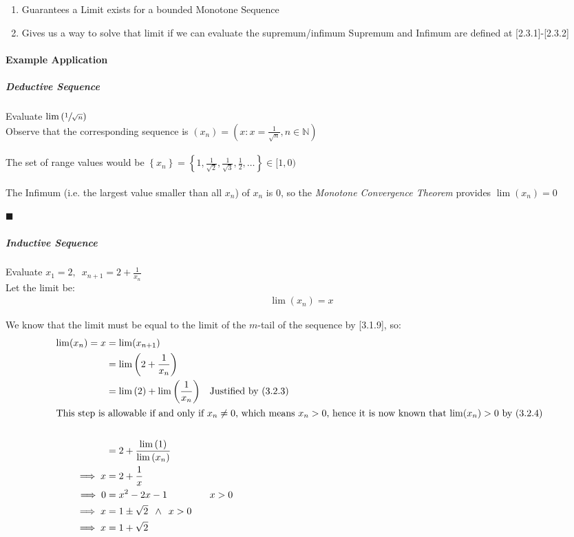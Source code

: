 \documentclass[class=article, crop=false]{standalone}
\begin{document}
\begin{enumerate}
  \item Guarantees a Limit exists for a bounded Monotone Sequence
  \item Gives us a way to solve that limit if we can evaluate the supremum/infimum
    \subitem Supremum and Infimum are defined at [2.3.1]-[2.3.2]
\end{enumerate}

\paragraph{Example Application}
\subparagraph{Deductive Sequence}
Evaluate $\lim\left( \sfrac{1}{\sqrt{n}} \right)$ \\
Observe that the corresponding sequence is $(x_n) = \left( x : x = \frac{1}{\sqrt{n}}, n \in \mathbb{N} \right)$ \\
\ \\
The set of range values would be $\left\{ x_n \right\} = \left\{ 1, \frac{1}{\sqrt{2}}, \frac{1}{\sqrt{3}}, \frac{1}{2}, \dots \right\} \in [1, 0)$ \\
\ \\
The Infimum (i.e. the largest value smaller than all $x_n$) of $x_n$ is 0, so the \textit{Monotone Convergence Theorem} provides  $\lim (x_n) = 0$

\begin{flushright}
  $\blacksquare$
\end{flushright}

\subparagraph{Inductive Sequence} Evaluate $x_{1} = 2, \enspace x_{n+1} = 2 + \frac{1}{x_n}$ \\
Let the limit be:
\begin{align}
  \lim (x_n) = x
  \label{limdefindeg}
\end{align}

We know that the limit must be equal to the limit of the $m$-tail of the sequence by [3.1.9], so:
\begin{align}
  \lim(x_n) = x&=\lim(x_{n+1})
  \label{limdefegind} \\
  &= \lim\left( 2+ \frac{1}{x_n} \right)  \notag \\
  &= \lim \left( 2 \right) + \lim \left( \frac{1}{x_n} \right)  \notag && \text{Justified by (3.2.3)}\\
  \intertext{This step is allowable if and only if $x_n \neq 0$, which means $x_n > 0$, hence it is now known that $\lim(x_n) > 0$ by (3.2.4) } \\
  &= 2 + \frac{\lim{(1)}}{\lim{(x_n)}}  \notag  \\
  \implies x&= 2 + \frac{1}{x} \notag \\
  \implies  0 &= x^{2} -2x - 1 && x>0  \notag \\
  \implies x &= 1 \pm \sqrt{2} \enspace  \wedge \enspace x>0  \notag \\
  \implies x &= 1 + \sqrt{2}  \notag  
\end{align}
\end{document}

